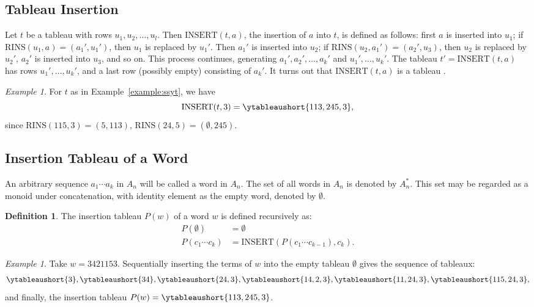 \documentclass[10pt]{amsproc}
\theoremstyle{definition}
\newtheorem{definition}[theorem]{Definition}
\theoremstyle{remark}
\newtheorem{example}[theorem]{Example}
\newcommand{\rowins}{\mathrm{RINS}}
\newcommand{\ins}{\mathrm{INSERT}}
\begin{document}
\subsection{Tableau Insertion}
\label{sec:tableau-insertion}
Let $t$ be a tableau with rows $u_1,u_2,\dotsc, u_l$.
Then $\ins(t,a)$, the insertion of $a$ into $t$, is defined as follows: first $a$ is inserted into $u_1$; if $\rowins(u_1,a)=(a_1',u_1')$, then $u_1$ is replaced by $u_1'$.
Then $a_1'$ is inserted into $u_2$; if $\rowins(u_2,a_1')=(a_2',u_3)$, then $u_2$ is replaced by $u_2'$, $a_2'$ is inserted into $u_3$, and so on.
This process continues, generating $a_1',a_2',\dotsc,a_k'$ and $u_1',\dotsc,u_k'$.
The tableau $t'=\ins(t,a)$ has rows $u_1',\dotsc,u_k'$, and a last row (possibly empty) consisting of $a_k'$.
It turns out that $\ins(t,a)$ is a tableau \cite{knuth}.
\begin{example}
  \label{example:insertion}
  For $t$ as in Example~\ref{example:ssyt}, we have
  \begin{displaymath}
    \ins(t,3) = \ytableaushort{113,245,3},
  \end{displaymath}
  since $\rowins(115,3)=(5,113)$, $\rowins(24,5)=(\emptyset,245)$.
\end{example}
\subsection{Insertion Tableau of a Word}
\label{sec:insert-tabl-word}
An arbitrary sequence $a_1\dotsb a_k$ in $A_n$ will be called a word in $A_n$.
The set of all words in $A_n$ is denoted by $A_n^*$.
This set may be regarded as a monoid under concatenation, with identity element as the empty word, denoted by $\emptyset$.
\begin{definition}
\label{definition:insertion-tableau}
The insertion tableau $P(w)$ of a word $w$ is defined recursively as:
\begin{align}
  P(\emptyset)&=\emptyset\\
  P(c_1\dotsb c_k)&=\ins(P(c_1\dotsb c_{k-1}), c_k).
\end{align}
\end{definition}
\begin{example}
  \label{example:insertion-tableau}
  Take $w=3421153$.
  Sequentially inserting the terms of $w$ into the empty tableau $\emptyset$ gives the sequence of tableaux:
  \begin{displaymath}
    \ytableaushort{3},\ytableaushort{34},\ytableaushort{24,3},\ytableaushort{14,2,3},\ytableaushort{11,24,3},\ytableaushort{115,24,3},
  \end{displaymath}
  and finally, the insertion tableau $P(w)=\ytableaushort{113,245,3}$.
\end{example}
\end{document}
